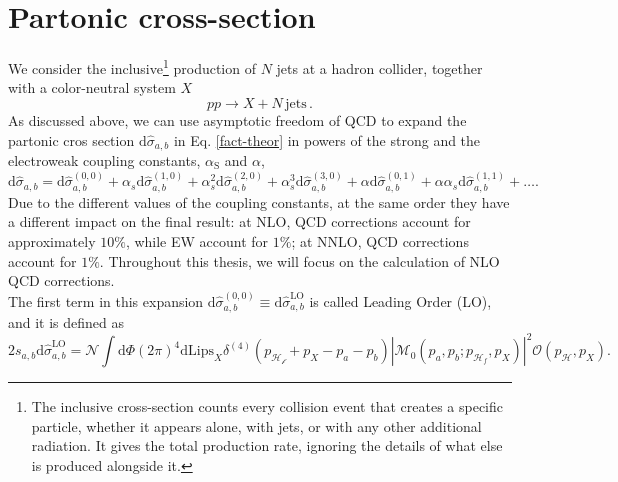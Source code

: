 \documentclass[a4paper, 12pt]{book}
\begin{document}
\section{Partonic cross-section}
We consider the inclusive\footnote{The inclusive cross-section counts every collision event that creates a specific particle, whether it appears alone, with jets, or with any other additional radiation. It gives the total production rate, ignoring the details of what else is produced alongside it.} production of $N$ jets at a hadron collider, together with a color-neutral system $X$
\begin{equation}
    pp \rightarrow X + N \, \mathrm{jets}  \, .
\end{equation}
As discussed above, we can use asymptotic freedom of QCD to expand the partonic cros section $\mathrm{d}\hat{\sigma}_{a,b}$ in Eq. \ref{fact-theor} in powers of the strong and the electroweak coupling constants, $\alpha_{\text{S}}$ and $\alpha$,
\begin{equation}
    \text{d} \hat{\sigma}_{a,b} = \text{d} \hat{\sigma}_{a,b}^{(0,0)} + \alpha_s \text{d} \hat{\sigma}_{a,b}^{(1,0)} + \alpha_s^2 \text{d} \hat{\sigma}_{a,b}^{(2,0)} + \alpha_s^3 \text{d} \hat{\sigma}_{a,b}^{(3,0)} + \alpha \text{d} \hat{\sigma}_{a,b}^{(0,1)} + \alpha \alpha_s \text{d} \hat{\sigma}_{a,b}^{(1,1)} + \dots .
\end{equation}
Due to the different values of the coupling constants, at the same order they have a different impact on the final result: at NLO, QCD corrections account for approximately $10\%$, while EW account for $1\%$; at NNLO, QCD corrections account for $1\%$. Throughout this thesis, we will focus on the calculation of NLO QCD corrections. \\
The first term in this expansion $\text{d} \hat{\sigma}_{a,b}^{(0,0)} \equiv \text{d} \hat{\sigma}_{a,b}^{\text{LO}}$ is called Leading Order (LO), and it is defined as \cite{Devoto:2025jql}
\begin{equation}
    2s_{a,b}\text{d} \hat{\sigma}_{a,b}^{\text{LO}} = \mathcal{N} \int \mathrm{d}\Phi (2\pi)^4 \mathrm{dLips}_X \delta^{(4)}(p_\mathcal{H_f}+p_X-p_a-p_b) \left|\mathcal{M}_0(p_a,p_b;p_{\mathcal{H}_f},p_X) \right|^2 \mathcal{O}(p_\mathcal{H},p_X).
    \label{leading-order}
\end{equation}
\end{document}
